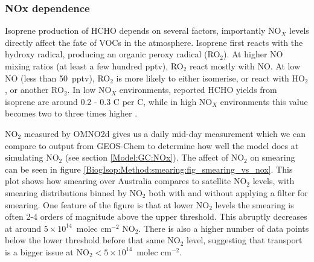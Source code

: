       
      
    
    \subsubsection{NOx dependence}
      
      Isoprene production of HCHO depends on several factors, importantly NO$_X$ levels directly affect the fate of VOCs in the atmosphere.
      Isoprene first reacts with the hydroxy radical, producing an organic peroxy radical (RO$_2$).
      At higher NO mixing ratios (at least a few hundred pptv), RO$_2$ react mostly with NO. 
      At low NO (less than 50~pptv), RO$_2$ is more likely to either isomerise, or react with HO$_2$, or another RO$_2$.
      In low NO$_X$ environments, reported HCHO yields from isoprene are around 0.2 - 0.3 C per C, while in high NO$_X$ environments this value becomes two to three times higher \parencite{Palmer2003, Wolfe2016}.

      
      NO$_2$ measured by OMNO2d gives us a daily mid-day measurement which we can compare to output from GEOS-Chem to determine how well the model does at simulating NO$_2$ (see section \ref{Model:GC:NOx}).
      The affect of NO$_2$ on smearing can be seen in figure \ref{BiogIsop:Method:smearing:fig_smearing_vs_nox}.
      This plot shows how smearing over Australia compares to satellite NO$_2$ levels, with smearing distributions binned by NO$_2$ both with and without applying a filter for smearing.
      One feature of the figure is that at lower NO$_2$ levels the smearing is often 2-4 orders of magnitude above the upper threshold. 
      This abruptly decreases at around $5 \times 10^{14} $~molec cm$^{-2}$ NO$_2$.
      There is also a higher number of data points below the lower threshold before that same NO$_2$ level, suggesting that transport is a bigger issue at NO$_2 < 5 \times 10^{14} $~molec cm$^{-2}$. 
      
